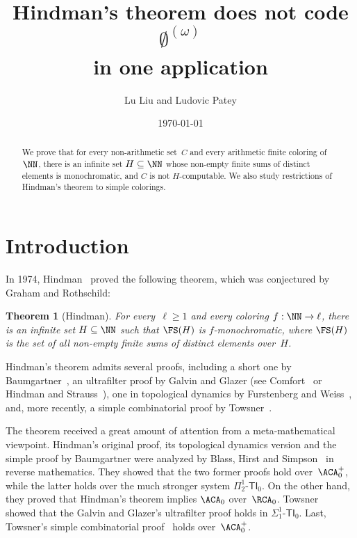 \documentclass{article}
\title{Hindman's theorem does not code $\emptyset^{(\omega)}$\\ in one application}
\date{\today}
\author{Lu Liu and Ludovic Patey}
\newtheorem{theorem}{Theorem}
\numberwithin{theorem}{section}
\begin{document}
\maketitle

\begin{abstract}
We prove that for every non-arithmetic set~$C$ and every arithmetic finite coloring of~$\NN$, there is an infinite set $H \subseteq \NN$ whose non-empty finite sums of distinct elements is monochromatic, and $C$ is not $H$-computable. We also study restrictions of Hindman's theorem to simple colorings.
\end{abstract}


\section{Introduction}

In 1974, Hindman~\cite{hindmanFiniteSumsSequences1974} proved the following theorem, which was conjectured by Graham and Rothschild:

\begin{theorem}[Hindman]
For every~$\ell \geq 1$ and every coloring $f : \NN \to \ell$, there is an infinite set $H \subseteq \NN$ such that $\FS(H)$ is $f$-monochromatic, where $\FS(H)$ is the set of all non-empty finite sums of distinct elements over~$H$.
\end{theorem}

Hindman's theorem admits several proofs, including a short one by Baumgartner~\cite{baumgartnerShortProofHindmans1974}, an ultrafilter proof by Galvin and Glazer (see Comfort~\cite{comfortUltrafiltersOldNew1977} or Hindman and Strauss~\cite{hindmanAlgebraStoneCechCompactification2012}), one in topological dynamics by Furstenberg and Weiss~\cite{furstenberg1978topological}, and, more recently, a simple combinatorial proof by Towsner~\cite{towsnerSimpleProofDifficult2012}.

The theorem received a great amount of attention from a meta-mathematical viewpoint. Hindman's original proof, its topological dynamics version and the simple proof by Baumgartner were analyzed by Blass, Hirst and Simpson~\cite{blassLogicalAnalysisTheorems1987} in reverse mathematics. They showed that the two former proofs hold over~$\ACA_0^+$, while the latter holds over the much stronger system $\Pi^1_2\mbox{-}\mathsf{TI}_0$. On the other hand, they proved that Hindman's theorem implies $\ACA_0$ over~$\RCA_0$. Towsner~\cite{towsner2011hindman} showed that the Galvin and Glazer's ultrafilter proof holds in $\Sigma^1_1\mbox{-}\mathsf{TI}_0$. Last, Towsner's simple combinatorial proof~\cite{towsnerSimpleProofDifficult2012} holds over~$\ACA_0^+$. 
\end{document}
